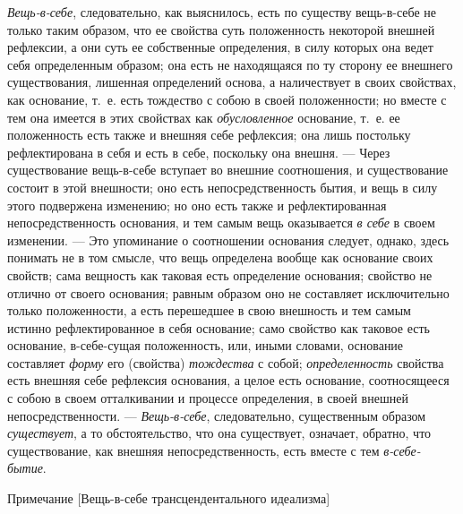 {\em Вещь-в-себе}, следовательно, как выяснилось, есть
по существу вещь-в-себе не только таким образом, что ее свойства суть
положенность некоторой внешней рефлексии, а они суть ее собственные
определения, в силу которых она ведет себя определенным образом; она есть
не находящаяся по ту сторону ее внешнего существования, лишенная
определений основа, а наличествует в своих свойствах, как основание, т.~е.
есть тождество с собою в своей положенности; но вместе с тем она имеется в
этих свойствах как {\em обусловленное} основание, т.~е.
ее положенность есть также и внешняя себе рефлексия; она лишь постольку
рефлектирована в себя и есть в себе, поскольку она внешня. — Через
существование вещь-в-себе вступает во внешние соотношения, и существование
состоит в этой внешности; оно есть непосредственность бытия, и вещь в силу
этого подвержена изменению; но оно есть также и рефлектированная
непосредственность основания, и тем самым вещь оказывается
{\em в себе} в своем изменении. — Это упоминание о
соотношении основания следует, однако, здесь понимать не в том смысле, что
вещь определена вообще как основание своих свойств; сама вещность как
таковая есть определение основания; свойство не отлично от своего
основания; равным образом оно не составляет исключительно только
положенности, а есть перешедшее в свою внешность и тем самым истинно
рефлектированное в себя основание; само свойство как таковое есть
основание, в-себе-сущая положенность, или, иными словами, основание
составляет {\em форму} его (свойства)
{\em тождества} с собой;
{\em определенность} свойства есть внешняя себе
рефлексия основания, а целое есть основание, соотносящееся с собою в своем
отталкивании и процессе определения, в своей внешней непосредственности. —
{\em Вещь-в-себе}, следовательно, существенным образом
{\em существует}, а то обстоятельство, что она
существует, означает, обратно, что существование, как внешняя
непосредственность, есть вместе с тем
{\em в-себе-бытие}.

{\centering
Примечание
[Вещь-в-себе трансцендентального идеализма]
\par}

